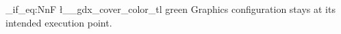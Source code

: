 \documentclass[
  CAT,no-cover,no-toc,
  maincolor=red,
  doc-name={DIRECT-CLASS},
  cover-config={text-minititle={NESTED-CLASS}}
]{P3CTeX}
\begin{document}
\ExplSyntaxOn
\tl_if_eq:NnF \l__gdx_cover_color_tl {green}
  {}
\ExplSyntaxOff
Graphics configuration stays at its intended execution point.
\end{document}

